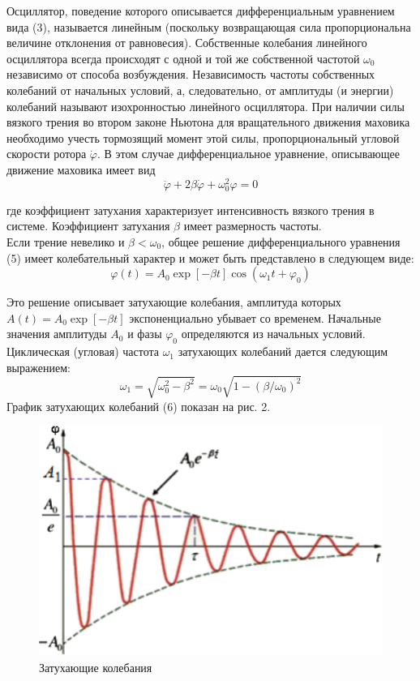 \documentclass[a4paper]{article}
\begin{document}
Осциллятор, поведение которого описывается дифференциальным уравнением вида (3), называется линейным (поскольку возвращающая сила пропорциональна величине отклонения от равновесия). Собственные колебания линейного осциллятора всегда
происходят с одной и той же собственной частотой $\omega_0$ независимо от способа возбуждения. Независимость частоты собственных
колебаний от начальных условий, а, следовательно, от амплитуды (и энергии) колебаний называют изохронностью линейного
осциллятора.
При наличии силы вязкого трения во втором законе Ньютона
для вращательного движения маховика необходимо учесть тормозящий момент этой силы, пропорциональный угловой скорости
ротора $\dot{\varphi}$. В этом случае дифференциальное уравнение, описывающее движение маховика имеет вид
\begin{equation}
	\ddot{\varphi}+2\beta\dot{\varphi}+\omega_0^2\varphi=0
\end{equation}

где коэффициент затухания характеризует интенсивность вязкого трения в системе. Коэффициент затухания $\beta$ имеет размерность частоты.\\
Если трение невелико и $\beta<\omega_0$, общее решение дифференциального уравнения (5) имеет колебательный характер и может
быть представлено в следующем виде:
\begin{equation}
	\varphi(t)=A_0\exp{[-\beta t]}\cos\left(\omega_1 t+\varphi_0\right)
\end{equation}

Это решение описывает затухающие колебания, амплитуда которых $A(t)=A_0\exp{[-\beta t]}$ экспоненциально убывает со временем. Начальные значения амплитуды $A_0$ и фазы $\varphi_0$ определяются из начальных условий. Циклическая (угловая) частота $\omega_1$ затухающих
колебаний дается следующим выражением:
\begin{equation}
	\omega_1=\sqrt{\omega_0^2-\beta^2}=\omega_0\sqrt{1-(\beta/\omega_0)^2}
\end{equation}
График затухающих колебаний (6) показан на рис. 2.
\begin{figure}[H]
	\begin{center}
		\includegraphics[scale=0.3]{pick_2.png}
	\end{center}
	\caption{Затухающие колебания}
\end{figure}
\end{document}
